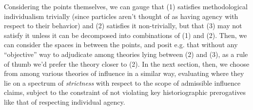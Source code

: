 \documentclass[11pt]{article}
\begin{document}
Considering the points themselves, we can gauge that (1) satisfies methodological individualism trivially (since particles aren't thought of as having agency with respect to their behavior) and (2) satisfies it non-trivially, but that (3) may not satisfy it unless it can be decomposed into combinations of (1) and (2). Then, we can consider the spaces in between the points, and posit e.g. that without any ``objective'' way to adjudicate among theories lying between (2) and (3), as a rule of thumb we'd prefer the theory closer to (2). In the next section, then, we choose from among various theories of influence in a similar way, evaluating where they lie on a spectrum of \textit{strictness} with respect to the scope of admissible influence claims, subject to the constraint of not violating key historiographic prerogatives like that of respecting individual agency.


\end{document}

